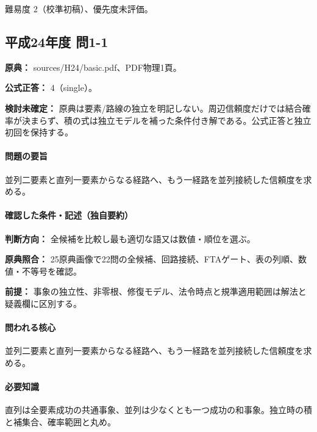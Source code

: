 \par 難易度 2（校準初稿）、優先度未評価。

\subsection{平成24年度 問1-1}
\label{q:h24-reg-basic-1-1}

\noindent\textbf{原典：} sources/H24/basic.pdf、PDF物理1頁。

\textbf{公式正答：} 4（single）。

\par\textbf{検討未確定：} 原典は要素/路線の独立を明記しない。周辺信頼度だけでは結合確率が決まらず、積の式は独立モデルを補った条件付き解である。公式正答と独立初回を保持する。

\paragraph{問題の要旨} 並列二要素と直列一要素からなる経路へ、もう一経路を並列接続した信頼度を求める。

\paragraph{確認した条件・記述（独自要約）}\mbox{}\par

\noindent\textbf{判断方向：} 全候補を比較し最も適切な語又は数値・順位を選ぶ。\par

\noindent\textbf{原典照合：} 25原典画像で22問の全候補、回路接続、FTAゲート、表の列順、数値・不等号を確認。\par

\noindent\textbf{前提：} 事象の独立性、非零根、修復モデル、法令時点と規準適用範囲は解法と疑義欄に区別する。\par

\paragraph{問われる核心} 並列二要素と直列一要素からなる経路へ、もう一経路を並列接続した信頼度を求める。

\paragraph{必要知識} 直列は全要素成功の共通事象、並列は少なくとも一つ成功の和事象。独立時の積と補集合、確率範囲と丸め。

